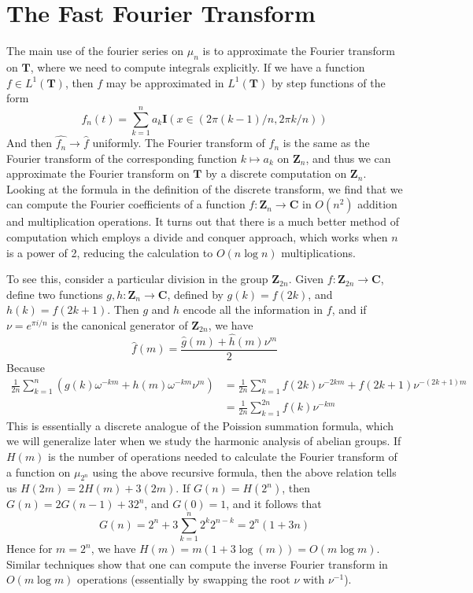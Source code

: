 \section{The Fast Fourier Transform}

The main use of the fourier series on $\mu_n$ is to approximate the Fourier transform on $\mathbf{T}$, where we need to compute integrals explicitly. If we have a function $f \in L^1(\mathbf{T})$, then $f$ may be approximated in $L^1(\mathbf{T})$ by step functions of the form
%
\[ f_n(t) = \sum_{k = 1}^{n} a_k \mathbf{I}(x \in (2 \pi (k-1) / n, 2 \pi k / n)) \]
%
And then $\hat{f_n} \to \hat{f}$ uniformly. The Fourier transform of $f_n$ is the same as the Fourier transform of the corresponding function $k \mapsto a_k$ on $\mathbf{Z}_n$, and thus we can approximate the Fourier transform on $\mathbf{T}$ by a discrete computation on $\mathbf{Z}_n$. Looking at the formula in the definition of the discrete transform, we find that we can compute the Fourier coefficients of a function $f: \mathbf{Z}_n \to \mathbf{C}$ in $O(n^2)$ addition and multiplication operations. It turns out that there is a much better method of computation which employs a divide and conquer approach, which works when $n$ is a power of 2, reducing the calculation to $O(n \log n)$ multiplications.

To see this, consider a particular division in the group $\mathbf{Z}_{2n}$. Given $f: \mathbf{Z}_{2n} \to \mathbf{C}$, define two functions $g,h: \mathbf{Z}_n \to \mathbf{C}$, defined by $g(k) = f(2k)$, and $h(k) = f(2k + 1)$. Then $g$ and $h$ encode all the information in $f$, and if $\nu = e^{\pi i/n}$ is the canonical generator of $\mathbf{Z}_{2n}$, we have
%
\[ \hat{f}(m) = \frac{\hat{g}(m) + \hat{h}(m) \nu^m}{2} \]
%
Because
%
\begin{align*}
    \frac{1}{2n} \sum_{k = 1}^{n} \left( g(k) \omega^{-km} + h(m) \omega^{-km} \nu^m \right) &= \frac{1}{2n} \sum_{k = 1}^n f(2k) \nu^{-2km} + f(2k + 1) \nu^{-(2k+1)m}\\
    &= \frac{1}{2n} \sum_{k = 1}^{2n} f(k) \nu^{-km}
\end{align*}
%
This is essentially a discrete analogue of the Poission summation formula, which we will generalize later when we study the harmonic analysis of abelian groups. If $H(m)$ is the number of operations needed to calculate the Fourier transform of a function on $\mu_{2^n}$ using the above recursive formula, then the above relation tells us $H(2m) = 2H(m) + 3 (2m)$. If $G(n) = H(2^n)$, then $G(n) = 2G(n-1) + 3 2^n$, and $G(0) = 1$, and it follows that
%
\[ G(n) = 2^n + 3 \sum_{k = 1}^n 2^{k} 2^{n-k} = 2^n(1 + 3n) \]
%
Hence for $m = 2^n$, we have $H(m) = m(1 + 3 \log (m)) = O(m \log m)$. Similar techniques show that one can compute the inverse Fourier transform in $O(m \log m)$ operations (essentially by swapping the root $\nu$ with $\nu^{-1}$).

